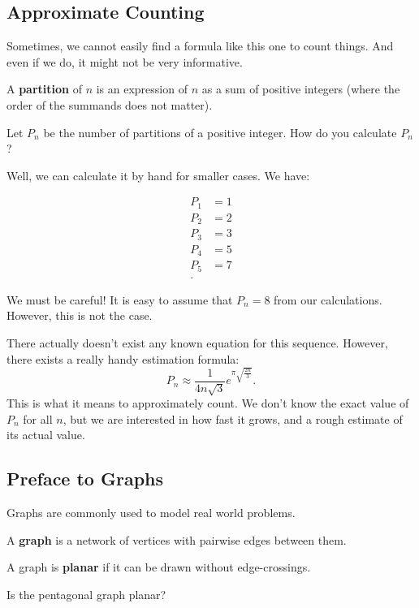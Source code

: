 \subsection{Approximate Counting}
Sometimes, we cannot easily find a formula like this one to count things. And even if we do, it might not be very informative. 

\begin{definition}
	A \textbf{partition} of \( n \) is an expression of \( n \) as a sum of positive integers (where the order of the summands does not matter).
\end{definition}

\begin{eg}
	Let \( P_n \) be the number of partitions of a positive integer. How do you calculate \( P_n \)?
\end{eg}

Well, we can calculate it by hand for smaller cases. We have:

\begin{align*}
	P_1 &= 1 \\
	P_2 &= 2 \\
	P_3 &= 3 \\
	P_4 &= 5 \\
	P_5 &= 7 \\
.\end{align*}

\begin{note}
We must be careful! It is easy to assume that \( P_n = 8 \) from our calculations. However, this is not the case.
\end{note}

There actually doesn't exist any known equation for this sequence. However, there exists a really handy estimation formula:\[
	P_n \approx \frac{1}{4n\sqrt{3} }e^{\pi \sqrt{\frac{2n}{3} } }
.\] 
This is what it means to approximately count. We don't know the exact value of \( P_n \) for all \( n \), but we are interested in how fast it grows, and a rough estimate of its actual value.

\subsection{Preface to Graphs}
Graphs are commonly used to model real world problems.
\begin{definition}
	A \textbf{graph} is a network of vertices with pairwise edges between them.
\end{definition}

\begin{definition}
	A graph is \textbf{planar} if it can be drawn without edge-crossings.
\end{definition}

Is the pentagonal graph planar?
